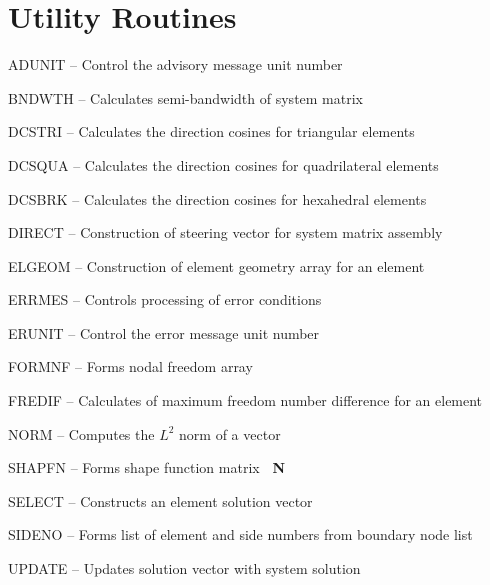\section{Utility Routines}
\begin{list}{}{\leftmargin=57pt }
\item[ADUNIT \hfill] -- Control the advisory message unit number
\item[BNDWTH \hfill] -- Calculates semi-bandwidth of system matrix
\item[DCSTRI \hfill] -- Calculates the direction cosines for triangular elements
\item[DCSQUA \hfill] -- Calculates the direction cosines for quadrilateral elements
\item[DCSBRK \hfill] -- Calculates the direction cosines for hexahedral elements
\item[DIRECT \hfill] -- Construction of steering vector for system matrix assembly
\item[ELGEOM \hfill] -- Construction of element geometry array for an element
\item[ERRMES \hfill] -- Controls processing of error conditions
\item[ERUNIT \hfill] -- Control the error message unit number
\item[FORMNF \hfill] -- Forms nodal freedom array
\item[FREDIF \hfill] -- Calculates of maximum freedom number difference for an element
\item[NORM \hfill]   -- Computes the $L^2$ norm of a vector
\item[SHAPFN \hfill] -- Forms shape function matrix {\bf~N}
\item[SELECT \hfill] -- Constructs an element solution vector
\item[SIDENO \hfill] -- Forms list of element and side numbers from boundary node list
\item[UPDATE \hfill] -- Updates solution vector with system solution
\end{list}
